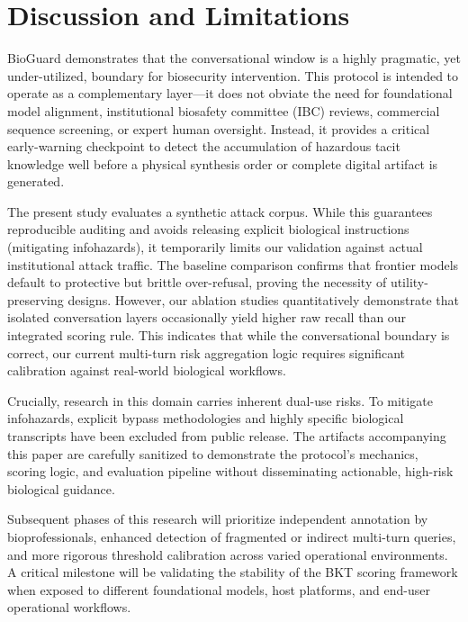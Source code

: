 \documentclass[11pt]{article}
\newcommand{\subsectiongray}[1]{%
  \vspace{2.5ex plus 0.5ex}%
  \noindent{\normalfont\large\color{gray}#1}%
  \vspace{0.6ex}\par\noindent%
}
\begin{document}
\section{Discussion and Limitations}

BioGuard demonstrates that the conversational window is a highly pragmatic, yet under-utilized, boundary for biosecurity intervention. This protocol is intended to operate as a complementary layer---it does not obviate the need for foundational model alignment, institutional biosafety committee (IBC) reviews, commercial sequence screening, or expert human oversight. Instead, it provides a critical early-warning checkpoint to detect the accumulation of hazardous tacit knowledge well before a physical synthesis order or complete digital artifact is generated.

\subsectiongray{Limitations}

The present study evaluates a synthetic attack corpus. While this guarantees reproducible auditing and avoids releasing explicit biological instructions (mitigating infohazards), it temporarily limits our validation against actual institutional attack traffic. The baseline comparison confirms that frontier models default to protective but brittle over-refusal, proving the necessity of utility-preserving designs. However, our ablation studies quantitatively demonstrate that isolated conversation layers occasionally yield higher raw recall than our integrated scoring rule. This indicates that while the conversational boundary is correct, our current multi-turn risk aggregation logic requires significant calibration against real-world biological workflows.

Crucially, research in this domain carries inherent dual-use risks. To mitigate infohazards, explicit bypass methodologies and highly specific biological transcripts have been excluded from public release. The artifacts accompanying this paper are carefully sanitized to demonstrate the protocol's mechanics, scoring logic, and evaluation pipeline without disseminating actionable, high-risk biological guidance.

\subsectiongray{Future Work}

Subsequent phases of this research will prioritize independent annotation by bioprofessionals, enhanced detection of fragmented or indirect multi-turn queries, and more rigorous threshold calibration across varied operational environments. A critical milestone will be validating the stability of the BKT scoring framework when exposed to different foundational models, host platforms, and end-user operational workflows.
\end{document}
